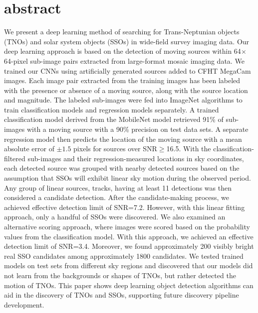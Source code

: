 \label{chapter: Paper}

\section{abstract}

We present a deep learning method of searching for Trans-Neptunian objects (TNOs) and solar system objects (SSOs) in wide-field survey imaging data.
Our deep learning approach is based on the detection of moving sources within 64$\times$64-pixel sub-image pairs extracted from large-format mosaic imaging data.
We trained our CNNs using artificially generated sources added to CFHT MegaCam images.
Each image pair extracted from the training images has been labeled with the presence or absence of a moving source, along with the source location and magnitude.
The labeled sub-images were fed into ImageNet algorithms to train classification models and regression models separately.
A trained classification model derived from the MobileNet model retrieved 91\% of sub-images with a moving source with a 90\% precision on test data sets.
A separate regression model then predicts the location of the moving source with a mean absolute error of $\pm1.5$ pixels for sources over SNR$\geq$16.5.
With the classification-filtered sub-images and their regression-measured locations in sky coordinates, each detected source was grouped with nearby detected sources based on the assumption that SSOs will exhibit linear sky motion during the observed period. 
Any group of linear sources, tracks, having at least 11 detections was then considered a candidate detection.
After the candidate-making process, we achieved effective detection limit of SNR=7.2.
However, with this linear fitting approach, only a handful of SSOs were discovered.
We also examined an alternative scoring approach, where images were scored based on the probability values from the classification model.
With this approach, we achieved an effective detection limit of SNR=3.4.
Moreover, we found approximately 200 visibly bright real SSO candidates among approximately 1800 candidates.
We tested trained models on test sets from different sky regions and discovered that our models did not learn from the backgrounds or shapes of TNOs, but rather detected the motion of TNOs.
This paper shows deep learning object detection algorithms can aid in the discovery of TNOs and SSOs, supporting future discovery pipeline development.


